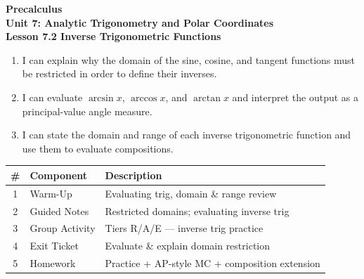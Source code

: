 \documentclass[10pt]{article}
\begin{document}
\vspace{-0.8in}

\begin{center}
  {\color{white}\textbf{\LARGE Precalculus}}\\[4pt]
  {\color{skymid}\large\textbf{Unit 7: Analytic Trigonometry and Polar Coordinates}}\\[6pt]
  {\color{white}\textbf{\large Lesson 7.2 \quad Inverse Trigonometric Functions}}
\end{center}

\vspace{0.22in}
\namedateperiod
\vspace{0.18in}

\begin{learningtargetbox}
\small
\begin{enumerate}[leftmargin=1.5em, itemsep=5pt]
  \item I can explain why the domain of the sine, cosine, and tangent
        functions must be restricted in order to define their inverses.
  \item I can evaluate $\arcsin x$, $\arccos x$, and $\arctan x$ and
        interpret the output as a principal-value angle measure.
  \item I can state the domain and range of each inverse trigonometric
        function and use them to evaluate compositions.
\end{enumerate}
\end{learningtargetbox}

\vspace{0.14in}

\begin{tocbox}
\small
\renewcommand{\arraystretch}{1.5}
\begin{tabularx}{\linewidth}{@{} c l X @{}}
\rowcolor{sky}
\textbf{\#} & \textbf{Component} & \textbf{Description} \\
\midrule
1 & Warm-Up        & Evaluating trig, domain \& range review \\
2 & Guided Notes   & Restricted domains; evaluating inverse trig \\
3 & Group Activity & Tiers R/A/E --- inverse trig practice \\
4 & Exit Ticket    & Evaluate \& explain domain restriction \\
5 & Homework       & Practice + AP-style MC + composition extension \\
\end{tabularx}
\end{tocbox}
\end{document}
